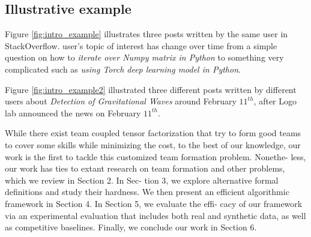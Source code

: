 {\subsection{Illustrative example}
Figure \ref{fig:intro_example} illustrates three posts written by the same user in StackOverflow. user's topic of interest has change over time from a simple question on how to \textit{iterate over Numpy matrix in Python} to something very complicated such as \textit{using Torch deep learning model in Python}. 


Figure \ref{fig:intro_example2} illustrated three different posts written by different users about \textit{Detection of Gravitational Waves} around February $11^{th}$, after Logo lab announced the news on February $11^{th}$.


While there exist team coupled tensor factorization that try to form good teams to cover some skills while minimizing the cost, to the best of our knowledge, our work is the first to tackle this customized team formation problem. Nonethe- less, our work has ties to extant research on team formation and other problems, which we review in Section 2. In Sec- tion 3, we explore alternative formal definitions and study their hardness. We then present an efficient algorithmic framework in Section 4. In Section 5, we evaluate the effi- cacy of our framework via an experimental evaluation that includes both real and synthetic data, as well as competitive baselines. Finally, we conclude our work in Section 6.

}
